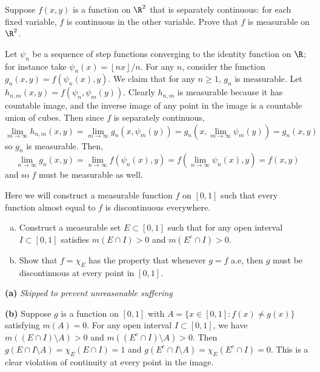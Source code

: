 \documentclass[11pt,letterpaper]{article}
\begin{document}
\begin{solution}
\end{solution}

\begin{cproblem}{23}
    Suppose $f(x,y)$ is a function on $\R^2$ that is separately continuous: for each fixed variable, $f$ is continuous in the other variable. Prove that $f$ is measurable on $\R^2$.
\end{cproblem}

\begin{solution}
    Let $\psi_n$ be a sequence of step functions converging to the identity function on $\R$; for instance take $\psi_n(x)=\left\lfloor nx \right\rfloor /n$. For any $n$, consider the function $g_n(x,y)=f(\psi_n(x),y)$. We claim that for any $n\geq 1$, $g_n$ is measurable. Let $h_{n,m}(x,y)=f(\psi_n,\psi_m(y))$. Clearly $h_{n,m}$ is measurable because it has countable image, and the inverse image of any point in the image is a countable union of cubes. Then since $f$ is separately continuous,
    \[
        \lim_{m\to\infty} h_{n,m}(x,y) = \lim_{m\to \infty} g_n(x,\psi_m(y)) = g_n\left(x,\lim_{m\to\infty}\psi_m(y)\right)= g_n(x,y)
    \]
    so $g_n$ is measurable. Then,
    \[
        \lim_{n\to\infty} g_n(x,y)=\lim_{n\to\infty} f(\psi_n(x), y)=f\left(\lim_{n\to\infty}\psi_n(x),y\right)=f(x,y)
    \]
    and so $f$ must be measurable as well.  
\end{solution}

\begin{cproblem}{36}
    Here we will construct a measurable function $f$ on $[0,1]$ such that every function almost equal to $f$ is discontinuous everywhere.
    \begin{enumerate}[(a)]
        \item Construct a measurable set $E\subset [0,1]$ such that for any open interval $I\subset [0,1]$ satisfies $m(E\cap I)>0$ and $m(E^c\cap I)>0$.
        \item Show that $f=\chi_E$ has the property that whenever $g=f$ a.e, then $g$ must be discontinuous at every point in $[0,1]$.
    \end{enumerate} 
\end{cproblem}

\begin{solution}
    \textbf{(a)} \textit{Skipped to prevent unreasonable suffering}

    \textbf{(b)} Suppose $g$ is a function on $[0,1]$ with $A=\{x\in [0,1] : f(x)\neq g(x)\}$ satisfying $m(A)=0$. For any open interval $I\subset [0,1]$, we have $m((E\cap I)\setminus A)>0$ and $m((E^c\cap I)\setminus A)>0$. Then $g(E\cap I\setminus A) = \chi_E(E\cap I) = 1$ and $g(E^c\cap I\setminus A)=\chi_E(E^c\cap I)=0$. This is a clear violation of continuity at every point in the image.
\end{solution}
\end{document}
